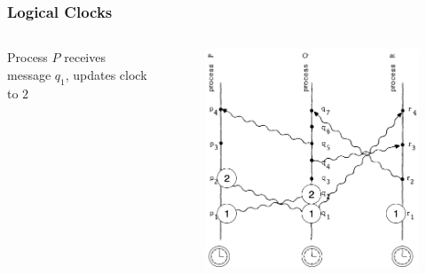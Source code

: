 \documentclass{beamer}
\begin{document}
\frame
{
	\frametitle{Logical Clocks}

	\begin{columns}
	\begin{column}{0.6\textwidth}

		Process $P$ receives message $q_1$, updates clock to $2$


	\end{column}
	\begin{column}{0.4\textwidth}

		\begin{figure}[ht!]
		\includegraphics[width=\textwidth]{files/ClockDist-Impl-Logical-Clock-2.png}
		\end{figure}


	\end{column}
	\end{columns}


}
\end{document}
